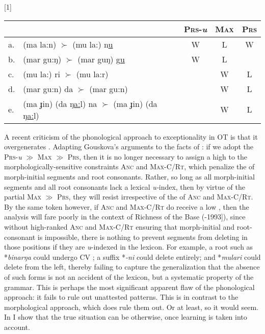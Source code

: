 \documentclass[output=paper,
modfonts
]{LSP/langsci}
\begin{document}
\ea \label{ex:round:22}
\renewcommand*\arraystretch{1.2}
\scalebox{1}[1]{\begin{tabular}[t]{|ll||c|c|c|}
\firsthline
 & & \textsc{Prs}-\textit{u} & \textsc{Max} & \textsc{Prs} \\
\hline
\hline
a. & (ma la:n) ${\succ}$ (mu la:) n\underline{u} & W & L&W\\
\hline
b. & (mar gu:ŋ) ${\succ}$ (mar guŋ) g\underline{u} & W & L &\\
\hline
c. & (mu la:) ri ${\succ}$ (mu la:r) & & W & L\\
\hline
d. & (mar gu:n) da ${\succ}$ (mar gu:n) & & W & L\\
\hline
e. & (ma ɟin) (da ŋ\underline{a:}l) na ${\succ}$ (ma ɟin) (da ŋ\underline{a:}l) & & W & L\\
\hline
\end{tabular}}\renewcommand*\arraystretch{1}
\z

A recent criticism of the phonological approach to exceptionality in OT is that it overgenerates \citep{gouskova2012}. Adapting Gouskova's arguments to the facts of : if we adopt the  \textsc{Prs}\textsc{{}-}\textit{u}\textsc{} \textsc{${\gg}$} \textsc{Max} \textsc{${\gg}$} \textsc{Prs}, then it is no longer necessary to assign a high  to the morphologically-sensitive constraints \textsc{Anc} and \textsc{Max-C/Rt}, which penalize the  of morph-initial segments and root consonants. Rather, so long as all morph-initial segments and all root consonants lack a lexical \textit{u-}index,\textit{} then by virtue of the partial  \textsc{Max} \textsc{${\gg}$} \textsc{Prs}, they will resist  irrespective of the  of \textsc{Anc} and \textsc{Max-C/Rt}. By the same token however, if \textsc{Anc} and \textsc{Max-C/Rt} do receive a low , then the analysis will fare poorly in the context of Richness of the Base (\citealt{princesmolensky2004}-1993]), since without high-ranked \textsc{Anc} and \textsc{Max-C/Rt} ensuring that morph-initial and root-consonant  is impossible, there is nothing to prevent segments from deleting in those positions if they are \textit{u}-indexed in the lexicon. For example, a root such as *\textit{binar}\textit{ŋa} could undergo CV ; a suffix *\textit{{}-}\textit{ni} could delete entirely; and *\textit{mu}\textit{lari} could delete from the left, thereby failing to capture the generalization that the absence of such forms is not an accident of the lexicon, but a systematic property of the grammar. This is perhaps the most significant apparent flaw of the phonological approach: it fails to rule out unattested patterns. This is in contrast to the morphological approach, which does rule them out. Or at least, so it would seem. In  I show that the true situation can be otherwise, once learning is taken into account. 
\end{document}
